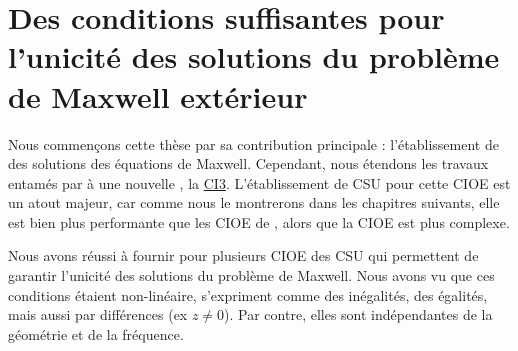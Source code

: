 \chapter[Des CSU des solutions du problème de Maxwell extérieur]{Des conditions suffisantes pour l'unicité des solutions du problème de Maxwell extérieur}
\label{sec:csu}
\minitoc
\newpage
{}
Nous commençons cette thèse par sa contribution principale : l'établissement de  des solutions des équations de Maxwell.
Cependant, nous étendons les travaux entamés par \cite{stupfel_sufficient_2011} à une nouvelle , la \hyperlink{ci3}{CI3}. L'établissement de CSU pour cette CIOE est un atout majeur, car comme nous le montrerons dans les chapitres suivants, elle est bien plus performante que les CIOE de \cite{stupfel_sufficient_2011}, alors que la CIOE est plus complexe.



Nous avons réussi à fournir pour plusieurs CIOE des CSU qui permettent de garantir l'unicité des solutions du problème de Maxwell. Nous avons vu que ces conditions étaient non-linéaire, s'expriment comme des inégalités, des égalités, mais aussi par différences (ex \(z\not=0\)). Par contre, elles sont indépendantes de la géométrie et de la fréquence.